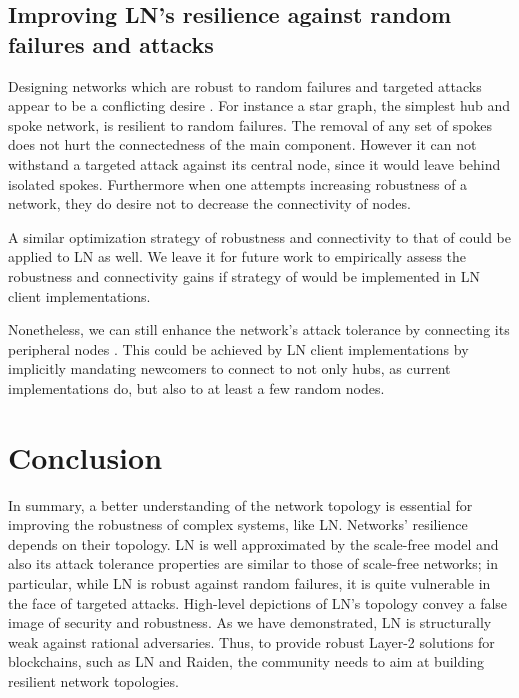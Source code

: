 \documentclass[runningheads]{llncs}
\begin{document}
\subsection{Improving LN's resilience against random failures and attacks}
Designing networks which are robust to random failures and targeted attacks appear to be a conflicting desire \cite{barabasi2016network}. For instance a star graph, the simplest hub and spoke network, is resilient to random failures. The removal of any set of spokes does not hurt the connectedness of the main component. However it can not withstand a targeted attack against its central node, since it would leave behind isolated spokes. Furthermore when one attempts increasing robustness of a network, they do desire not to decrease the connectivity of nodes.

A similar optimization strategy of robustness and connectivity to that of \cite{shargel2003optimization} could be applied to LN as well. We leave it for future work to empirically assess the robustness and connectivity gains if strategy of \cite{shargel2003optimization} would be implemented in LN client implementations. 

Nonetheless, we can still enhance the network's attack tolerance by connecting its peripheral nodes \cite{barabasi2016network}. This could be achieved by LN client implementations by implicitly mandating newcomers to connect to not only hubs, as current implementations do, but also to at least a few random nodes.

\section{Conclusion}
In summary, a better understanding of the network topology is essential
for improving the robustness of complex systems, like LN. Networks' resilience depends on their topology. LN is well approximated by the scale-free model and also its attack tolerance properties are similar to those of scale-free networks; in particular, while LN is robust against random failures, it is quite vulnerable in the face of targeted attacks. 
High-level depictions of LN's topology convey a false image of security and robustness. As we have demonstrated, LN is structurally weak against rational adversaries. Thus, to provide robust Layer-2 solutions for blockchains, such as LN and Raiden, the community needs to aim at building resilient network topologies.
\end{document}
